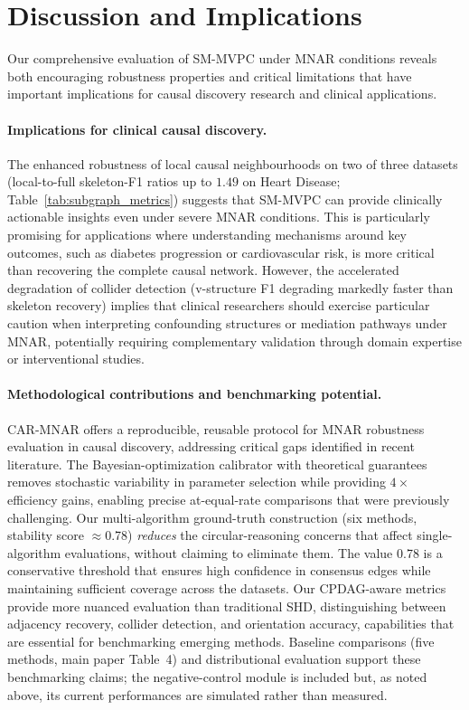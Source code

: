 \documentclass[runningheads]{llncs}
\newcommand{\katerina}{\textcolor{blue}}
\newcommand{\Matin}{\textcolor{magenta}}
\begin{document}
\section{Discussion and Implications}


Our comprehensive evaluation of SM-MVPC under MNAR conditions reveals both encouraging robustness properties and critical limitations that have important implications for causal discovery research and clinical applications.

\paragraph{Implications for clinical causal discovery.}
The enhanced robustness of local causal neighbourhoods on two of three datasets (local-to-full skeleton-F1 ratios up to $1.49$ on Heart Disease; Table~\ref{tab:subgraph_metrics}) suggests that SM-MVPC can provide clinically actionable insights even under severe MNAR conditions. This is particularly promising for applications where understanding mechanisms around key outcomes, such as diabetes progression or cardiovascular risk, is more critical than recovering the complete causal network. However, the accelerated degradation of collider detection (v-structure F1 degrading markedly faster than skeleton recovery) implies that clinical researchers should exercise particular caution when interpreting confounding structures or mediation pathways under MNAR, potentially requiring complementary validation through domain expertise or interventional studies.



\paragraph{Methodological contributions and benchmarking potential.}
CAR-MNAR offers a reproducible, reusable protocol for MNAR robustness evaluation in causal discovery, addressing critical gaps identified in recent literature. The Bayesian-optimization calibrator with theoretical guarantees removes stochastic variability in parameter selection while providing $4\times$ efficiency gains, enabling precise at-equal-rate comparisons that were previously challenging. Our multi-algorithm ground-truth construction (six methods, stability score $\approx$0.78) \emph{reduces} the circular-reasoning concerns that affect single-algorithm evaluations, without claiming to eliminate them.
The value 0.78 is a conservative threshold that ensures high confidence in consensus edges while maintaining sufficient coverage across the datasets. Our CPDAG-aware metrics provide more nuanced evaluation than traditional SHD, distinguishing between adjacency recovery, collider detection, and orientation accuracy, capabilities that are essential for benchmarking emerging methods. Baseline comparisons (five methods, main paper Table~4) and distributional evaluation support these benchmarking claims; the negative-control module is included but, as noted above, its current performances are simulated rather than measured.
\end{document}
